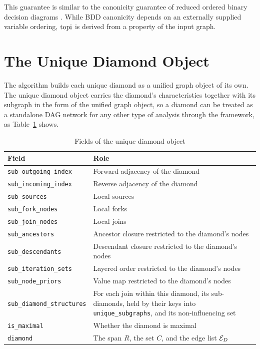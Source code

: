 \documentclass[12pt]{report}
\begin{document}
This guarantee is similar to the canonicity guarantee of reduced ordered binary decision diagrams \cite{bryant1986graph}. While BDD canonicity depends on an externally supplied variable ordering, $\mathrm{topi}$ is derived from a property of the input graph.

\section{The Unique Diamond Object}
\label{sec:dd-representation}
\label{sec:dd-selfsimilar}

The algorithm builds each unique diamond as a unified graph object of its own. The unique diamond object carries the diamond's characteristics together with its subgraph in the form of the unified graph object, so a diamond can be treated as a standalone DAG network for any other type of analysis through the framework, as Table~\ref{tab:dd-selfsimilar} shows.

\begin{table}[htbp]
\centering
\caption{Fields of the unique diamond object}
\label{tab:dd-selfsimilar}
\small
\renewcommand{\arraystretch}{1.15}
\begin{tabular}{|l|p{}|}
\hline
\textbf{Field} & \textbf{Role} \\
\hline
\texttt{sub\_outgoing\_index} & Forward adjacency of the diamond \\
\texttt{sub\_incoming\_index} & Reverse adjacency of the diamond \\
\texttt{sub\_sources} & Local sources \\
\texttt{sub\_fork\_nodes} & Local forks \\
\texttt{sub\_join\_nodes} & Local joins \\
\texttt{sub\_ancestors} & Ancestor closure restricted to the diamond's nodes \\
\texttt{sub\_descendants} & Descendant closure restricted to the diamond's nodes \\
\texttt{sub\_iteration\_sets} & Layered order restricted to the diamond's nodes \\
\texttt{sub\_node\_priors} & Value map restricted to the diamond's nodes \\
\texttt{sub\_diamond\_structures} & For each join within this diamond, its sub-diamonds, held by their keys into \texttt{unique\_subgraphs}, and its non-influencing set \\
\texttt{is\_maximal} & Whether the diamond is maximal \\
\texttt{diamond} & The span $R$, the set $C$, and the edge list $\mathcal{E}_D$ \\
\hline
\end{tabular}
\end{table}
\end{document}
